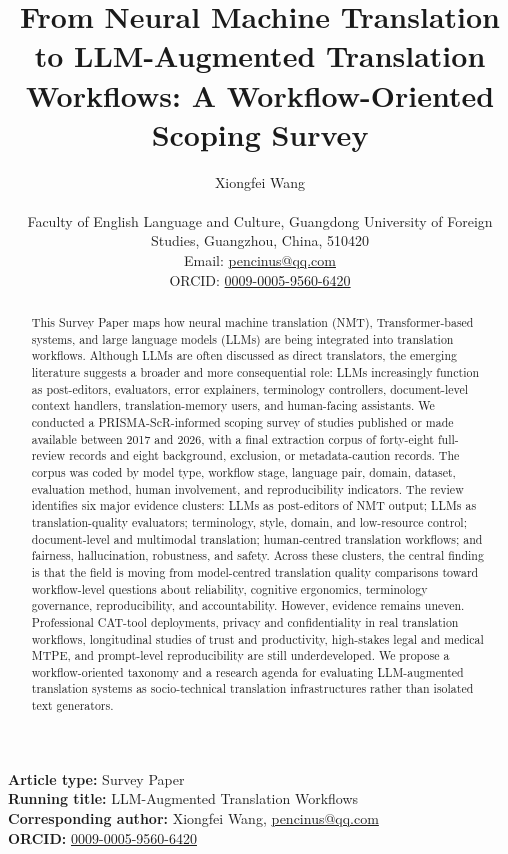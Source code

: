 \documentclass[11pt]{article}
\title{From Neural Machine Translation to LLM-Augmented Translation Workflows: A Workflow-Oriented Scoping Survey}
\author{Xiongfei Wang\\[0.3em]\begin{minipage}{0.86\textwidth}\centering
Faculty of English Language and Culture, Guangdong University of Foreign Studies, Guangzhou, China, 510420\\
Email: \href{mailto:pencinus@qq.com}{pencinus@qq.com}\\
ORCID: \href{https://orcid.org/0009-0005-9560-6420}{0009-0005-9560-6420}
\end{minipage}}
\date{}
\begin{document}
\maketitle
\noindent\textbf{Article type:} Survey Paper\\
\textbf{Running title:} LLM-Augmented Translation Workflows\\
\textbf{Corresponding author:} Xiongfei Wang, \href{mailto:pencinus@qq.com}{pencinus@qq.com}\\
\textbf{ORCID:} \href{https://orcid.org/0009-0005-9560-6420}{0009-0005-9560-6420}

\begin{abstract}
This Survey Paper maps how neural machine translation (NMT), Transformer-based systems, and large language models (LLMs) are being integrated into translation workflows. Although LLMs are often discussed as direct translators, the emerging literature suggests a broader and more consequential role: LLMs increasingly function as post-editors, evaluators, error explainers, terminology controllers, document-level context handlers, translation-memory users, and human-facing assistants. We conducted a PRISMA-ScR-informed scoping survey of studies published or made available between 2017 and 2026, with a final extraction corpus of forty-eight full-review records and eight background, exclusion, or metadata-caution records. The corpus was coded by model type, workflow stage, language pair, domain, dataset, evaluation method, human involvement, and reproducibility indicators. The review identifies six major evidence clusters: LLMs as post-editors of NMT output; LLMs as translation-quality evaluators; terminology, style, domain, and low-resource control; document-level and multimodal translation; human-centred translation workflows; and fairness, hallucination, robustness, and safety. Across these clusters, the central finding is that the field is moving from model-centred translation quality comparisons toward workflow-level questions about reliability, cognitive ergonomics, terminology governance, reproducibility, and accountability. However, evidence remains uneven. Professional CAT-tool deployments, privacy and confidentiality in real translation workflows, longitudinal studies of trust and productivity, high-stakes legal and medical MTPE, and prompt-level reproducibility are still underdeveloped. We propose a workflow-oriented taxonomy and a research agenda for evaluating LLM-augmented translation systems as socio-technical translation infrastructures rather than isolated text generators.
\end{abstract}
\end{document}
